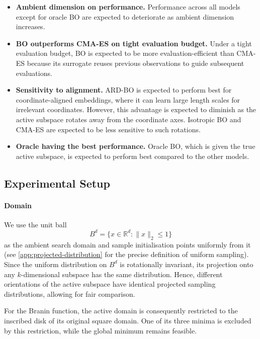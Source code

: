 \documentclass[10pt]{article}
\begin{document}
\begin{itemize}
    \item[\textbf{[H1]}]
     \textbf{Ambient dimension on performance.} Performance across all models except for oracle BO are expected to deteriorate as ambient dimension increases.
     
    \item[\textbf{[H2]}]
     \textbf{BO outperforms CMA-ES on tight evaluation budget.} Under a tight evaluation budget, BO is expected to be more evaluation-efficient than CMA-ES because its surrogate reuses previous observations to guide subsequent evaluations.

    \item[\textbf{[H3]}]
    \textbf{Sensitivity to alignment.} ARD-BO is expected to perform best for coordinate-aligned embeddings, where it can learn large length scales for irrelevant coordinates. However, this advantage is expected to diminish as the active subspace rotates away from the coordinate axes. Isotropic BO and CMA-ES are expected to be less sensitive to such rotations.

    \item[\textbf{[H4]}]
    \textbf{Oracle having the best performance.} Oracle BO, which is given the true active subspace, is expected to perform best compared to the other models.
\end{itemize}


\subsection{Experimental Setup}
\label{sec:exp-setup}
\paragraph{Domain}
We use the unit ball $$B^d = \{x\in\mathbb{R}^d:\|x\|_2\leq 1\}$$ as the ambient search domain and sample initialisation points uniformly from it (see \cref{app:projected-distribution} for the precise definition of uniform sampling). Since the uniform distribution on $B^d$ is rotationally invariant, its projection onto any $k$-dimensional subspace has the same distribution. Hence, different orientations of the active subspace have identical projected sampling distributions, allowing for fair comparison.

For the Branin function, the active domain is consequently restricted to the inscribed disk of its original square domain. One of its three minima is excluded by this restriction, while the global minimum remains feasible. 
\end{document}
